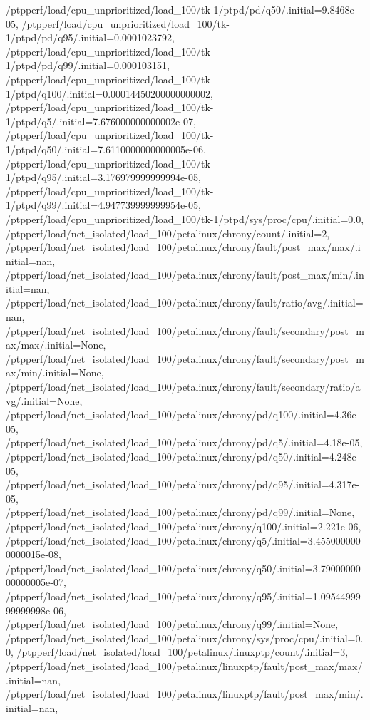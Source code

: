 {    /ptpperf/load/cpu_unprioritized/load_100/tk-1/ptpd/pd/q50/.initial=9.8468e-05,
    /ptpperf/load/cpu_unprioritized/load_100/tk-1/ptpd/pd/q95/.initial=0.0001023792,
    /ptpperf/load/cpu_unprioritized/load_100/tk-1/ptpd/pd/q99/.initial=0.000103151,
    /ptpperf/load/cpu_unprioritized/load_100/tk-1/ptpd/q100/.initial=0.00014450200000000002,
    /ptpperf/load/cpu_unprioritized/load_100/tk-1/ptpd/q5/.initial=7.676000000000002e-07,
    /ptpperf/load/cpu_unprioritized/load_100/tk-1/ptpd/q50/.initial=7.6110000000000005e-06,
    /ptpperf/load/cpu_unprioritized/load_100/tk-1/ptpd/q95/.initial=3.176979999999994e-05,
    /ptpperf/load/cpu_unprioritized/load_100/tk-1/ptpd/q99/.initial=4.947739999999954e-05,
    /ptpperf/load/cpu_unprioritized/load_100/tk-1/ptpd/sys/proc/cpu/.initial=0.0,
    /ptpperf/load/net_isolated/load_100/petalinux/chrony/count/.initial=2,
    /ptpperf/load/net_isolated/load_100/petalinux/chrony/fault/post_max/max/.initial=nan,
    /ptpperf/load/net_isolated/load_100/petalinux/chrony/fault/post_max/min/.initial=nan,
    /ptpperf/load/net_isolated/load_100/petalinux/chrony/fault/ratio/avg/.initial=nan,
    /ptpperf/load/net_isolated/load_100/petalinux/chrony/fault/secondary/post_max/max/.initial=None,
    /ptpperf/load/net_isolated/load_100/petalinux/chrony/fault/secondary/post_max/min/.initial=None,
    /ptpperf/load/net_isolated/load_100/petalinux/chrony/fault/secondary/ratio/avg/.initial=None,
    /ptpperf/load/net_isolated/load_100/petalinux/chrony/pd/q100/.initial=4.36e-05,
    /ptpperf/load/net_isolated/load_100/petalinux/chrony/pd/q5/.initial=4.18e-05,
    /ptpperf/load/net_isolated/load_100/petalinux/chrony/pd/q50/.initial=4.248e-05,
    /ptpperf/load/net_isolated/load_100/petalinux/chrony/pd/q95/.initial=4.317e-05,
    /ptpperf/load/net_isolated/load_100/petalinux/chrony/pd/q99/.initial=None,
    /ptpperf/load/net_isolated/load_100/petalinux/chrony/q100/.initial=2.221e-06,
    /ptpperf/load/net_isolated/load_100/petalinux/chrony/q5/.initial=3.4550000000000015e-08,
    /ptpperf/load/net_isolated/load_100/petalinux/chrony/q50/.initial=3.7900000000000005e-07,
    /ptpperf/load/net_isolated/load_100/petalinux/chrony/q95/.initial=1.0954499999999998e-06,
    /ptpperf/load/net_isolated/load_100/petalinux/chrony/q99/.initial=None,
    /ptpperf/load/net_isolated/load_100/petalinux/chrony/sys/proc/cpu/.initial=0.0,
    /ptpperf/load/net_isolated/load_100/petalinux/linuxptp/count/.initial=3,
    /ptpperf/load/net_isolated/load_100/petalinux/linuxptp/fault/post_max/max/.initial=nan,
    /ptpperf/load/net_isolated/load_100/petalinux/linuxptp/fault/post_max/min/.initial=nan,
}
